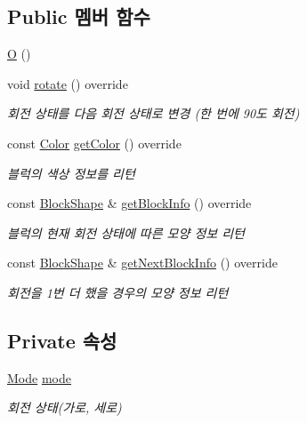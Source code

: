 \subsection*{Public 멤버 함수}
\begin{DoxyCompactItemize}
\item 
\mbox{\hyperlink{class_o_a44ab6b2c383356dff9624cbc12290495}{O}} ()
\item 
void \mbox{\hyperlink{class_o_ae1c0b5ef6d51aa94765531f555b47cd0}{rotate}} () override
\begin{DoxyCompactList}\small\item\em 회전 상태를 다음 회전 상태로 변경 (한 번에 90도 회전) \end{DoxyCompactList}\item 
const \mbox{\hyperlink{class_block_ad054b4ac51df79aa910040b2a2fdf7b5}{Color}} \mbox{\hyperlink{class_o_a2ffa14a52f6fa0f6964f25f75e2909ad}{get\+Color}} () override
\begin{DoxyCompactList}\small\item\em 블럭의 색상 정보를 리턴 \end{DoxyCompactList}\item 
const \mbox{\hyperlink{class_block_aca5d951639f113e2ebd7856209d6b9ab}{Block\+Shape}} \& \mbox{\hyperlink{class_o_a608161f6603f07da95a9d26ac7f0cacb}{get\+Block\+Info}} () override
\begin{DoxyCompactList}\small\item\em 블럭의 현재 회전 상태에 따른 모양 정보 리턴 \end{DoxyCompactList}\item 
const \mbox{\hyperlink{class_block_aca5d951639f113e2ebd7856209d6b9ab}{Block\+Shape}} \& \mbox{\hyperlink{class_o_a76a288c5f887c3b24cc6cb1c03bcd9b1}{get\+Next\+Block\+Info}} () override
\begin{DoxyCompactList}\small\item\em 회전을 1번 더 했을 경우의 모양 정보 리턴 \end{DoxyCompactList}\end{DoxyCompactItemize}
\subsection*{Private 속성}
\begin{DoxyCompactItemize}
\item 
\mbox{\hyperlink{class_block_a33a96023993478ad4b52426188454765}{Mode}} \mbox{\hyperlink{class_o_a8eab599843636b7f2f16ba71defceb45}{mode}}
\begin{DoxyCompactList}\small\item\em 회전 상태(가로, 세로) \end{DoxyCompactList}\end{DoxyCompactItemize}
